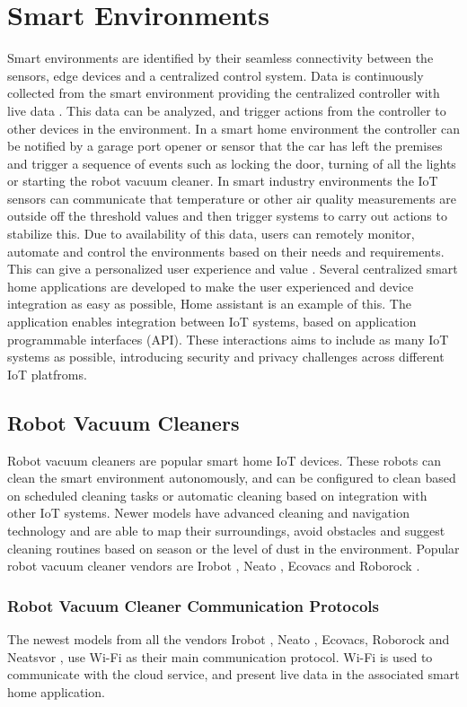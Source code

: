 \section{Smart Environments}
Smart environments are identified by their seamless connectivity between the sensors, edge devices and a centralized control system. Data is continuously collected from the smart environment providing the centralized controller with live data \cite{lin2016iot}. This data can be analyzed, and trigger actions from the controller to other devices in the environment. In a smart home environment the controller can be notified by a garage port opener or sensor that the car has left the premises and trigger a sequence of events such as locking the door, turning of all the lights or starting the robot vacuum cleaner. In smart industry environments the IoT sensors can communicate that temperature or other air quality measurements are outside off the threshold values and then trigger systems to carry out actions to stabilize this. Due to availability of this data, users can remotely monitor, automate and control the environments based on their needs and requirements. This can give a personalized user experience and value \cite{mantas2011security}. Several centralized smart home applications are developed to make the user experienced and device integration as easy as possible, Home assistant \cite{homeassistant2023} is an example of this. The application enables integration between IoT systems, based on application programmable interfaces (API). These interactions aims to include as many IoT systems as possible, introducing security and privacy challenges across different IoT platfroms. 

\subsection{Robot Vacuum Cleaners}
Robot vacuum cleaners are popular smart home IoT devices. These robots can clean the smart environment autonomously, and can be configured to clean based on scheduled cleaning tasks or automatic cleaning based on integration with other IoT systems. Newer models have advanced cleaning and navigation technology and are able to map their surroundings, avoid obstacles and suggest cleaning routines based on season or the level of dust in the environment. Popular robot vacuum cleaner vendors are Irobot \cite{irobot}, Neato \cite{Neato}, Ecovacs \cite{ecovacs} and Roborock \cite{roborock}. 


\subsubsection{Robot Vacuum Cleaner Communication Protocols}
The newest models from all the vendors Irobot \cite{irobot}, Neato \cite{Neato}, Ecovacs\cite{ecovacs}, Roborock\cite{roborock} and Neatsvor \cite{neatsvor}, use Wi-Fi as their main communication protocol. Wi-Fi is used to communicate with the cloud service, and present live data in the associated smart home application.

